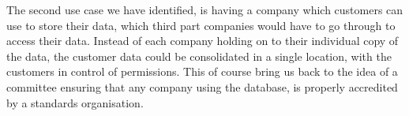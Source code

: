 \documentclass[11pt,journal]{IEEEtran}
\begin{document}
The second use case we have identified, is having a company which customers can use to store their data, which third part companies would have to go through to access their data. Instead of each company holding on to their individual copy of the data, the customer data could be consolidated in a single location, with the customers in control of permissions.  This of course bring us back to the idea of a committee ensuring that any company using the database, is properly accredited by a standards organisation.


{}

\end{document}
